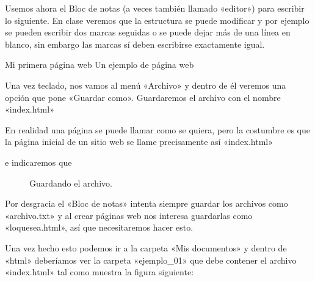 \documentclass[a4paper,12pt,spanish]{sphinxmanual}
\begin{document}
Usemos ahora el Bloc de notas (a veces también llamado «editor») para escribir lo siguiente. En clase veremos que la estructura se puede modificar y por ejemplo se pueden escribir dos marcas seguidas o se puede dejar más de una línea en blanco, sin embargo las marcas sí deben escribirse exactamente igual.

%
\begin{sphinxVerbatim}[commandchars=\\\{\}]
         Mi primera página web
     Un ejemplo de página web
\end{sphinxVerbatim}

Una vez teclado, nos vamos al menú «Archivo» y dentro de él veremos una opción que pone «Guardar como». Guardaremos el archivo con el nombre «index.html» %
\begin{footnote}[1]\sphinxAtStartFootnote
En realidad una página se puede llamar como se quiera, pero la costumbre es que la página inicial de un sitio web se llame precisamente así «index.html»
%
\end{footnote} e indicaremos que 

\begin{figure}[htbp]
\centering
\capstart

\noindent{}
\caption{Guardando el archivo.}\label{\detokenize{index:id6}}\end{figure}

Por desgracia el «Bloc de notas» intenta siempre guardar los archivos como «archivo.txt» y al crear páginas web nos interesa guardarlas como «loquesea.html», así que necesitaremos hacer esto.

Una vez hecho esto podemos ir a la carpeta «Mis documentos» y dentro de «html» deberíamos ver la carpeta «ejemplo\_01» que debe contener el archivo «index.html» tal como muestra la figura siguiente:
\end{document}

